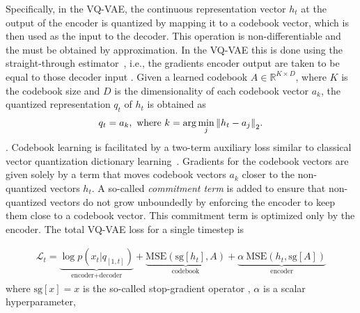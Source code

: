 Specifically, in the VQ-VAE, the continuous representation vector $h_t$ at the output of the encoder is quantized by mapping it to a codebook vector, which is then used as the input to the decoder. This operation is non-differentiable and the  must be obtained by approximation. In the VQ-VAE this is done using the straight-through estimator~\cite{bengio_estimating_2013}, i.e., the gradients  encoder output are taken to be equal to those  decoder input . Given a learned codebook $A\in\mathbb{R}^{K \times D}$, where $K$ is the codebook size and $D$ is the dimensionality of each codebook vector $a_k$, the quantized representation $q_t$ of $h_t$ is obtained as
\begin{align}
    q_t = a_k, \text{ where } k=\arg\min_j {\left\lVert h_t - a_j\right\rVert}_2 .
\end{align}
. 
Codebook learning is facilitated by a two-term auxiliary loss similar to
classical vector quantization dictionary 
learning~\cite{burton_generalization_1983, soong_vector_1985}. 
Gradients for the codebook vectors are given solely by a term that moves
codebook vectors $a_k$ closer to the non-quantized vectors $h_t$. A so-called
\emph{commitment term} is added to ensure that non-quantized vectors do not grow
unboundedly by enforcing the encoder to keep them close to a codebook vector.
This commitment term is optimized only by the encoder. The
total VQ-VAE loss for a single timestep is

\begin{align}
    \mathcal{L}_t = \underset{\text{encoder+decoder}}{\underbrace{\log p(x_t | q_{[1,t]})}} + \underset{\text{codebook}}{\underbrace{\text{MSE}\left(\mathrm{sg}\left[h_t\right], A\right)}} + \underset{\text{encoder}}{\underbrace{\alpha~\text{MSE}\left(h_t, \mathrm{sg}\left[A\right]\right)}}
    \label{eq: vector quantization losses}
\end{align}%
\noindent where  $\mathrm{sg}[x] = x$ is the so-called stop-gradient operator , $\alpha$ is a scalar hyperparameter, 

